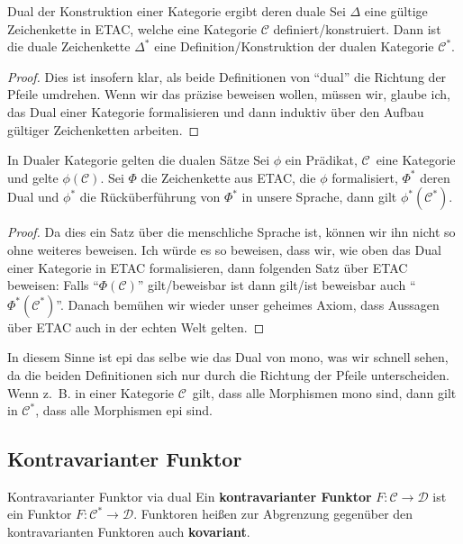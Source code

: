 \documentclass[a4paper]{amsart}
\theoremstyle{definition}
\newcommand{\CC}{\ensuremath{\mathcal{ C }}}
\newcommand{\DD}{\ensuremath{\mathcal{ D }}}
\newcommand{\zb}{z.~B. }
\begin{document}
\begin{Satz}{Dual der Konstruktion einer Kategorie ergibt deren duale}
   Sei $\Delta$ eine gültige Zeichenkette in ETAC, welche eine Kategorie $\CC$ definiert/konstruiert. Dann ist die duale Zeichenkette $\Delta^*$ eine Definition/Konstruktion der dualen Kategorie $\CC^*$.
\end{Satz}
\begin{proof}
   Dies ist insofern klar, als beide Definitionen von "`dual"' die Richtung der Pfeile umdrehen. Wenn wir das präzise beweisen wollen, müssen wir, glaube ich, das Dual einer Kategorie formalisieren und dann induktiv über den Aufbau gültiger Zeichenketten arbeiten.
\end{proof}

\begin{Satz}{In Dualer Kategorie gelten die dualen Sätze}
   Sei $\phi$ ein Prädikat, \CC\ eine Kategorie und gelte $\phi(\CC)$. Sei $\Phi$ die Zeichenkette aus ETAC, die $\phi$ formalisiert, $\Phi^*$ deren Dual und $\phi^*$ die Rücküberführung von $\Phi^*$ in unsere Sprache, dann gilt $\phi^*(\CC^*)$.
\end{Satz}
\begin{proof}
   Da dies ein Satz über die menschliche Sprache ist, können wir ihn nicht so ohne weiteres beweisen. Ich würde es so beweisen, dass wir, wie oben das  Dual einer Kategorie in ETAC formalisieren, dann folgenden Satz über ETAC beweisen: Falls "`$\Phi(\CC)$"' gilt/beweisbar ist dann gilt/ist beweisbar auch "`$\Phi^*(\CC^*)$"'. Danach bemühen wir wieder unser geheimes Axiom, dass Aussagen über ETAC auch in der echten Welt gelten.
\end{proof}

In diesem Sinne ist epi das selbe wie das Dual von mono, was wir schnell sehen, da die beiden Definitionen sich nur durch die Richtung der Pfeile unterscheiden. Wenn \zb in einer Kategorie \CC\ gilt, dass alle Morphismen mono sind, dann gilt in $\CC^*$, dass alle Morphismen epi sind.

\subsection{Kontravarianter Funktor}
\begin{Definition}{Kontravarianter Funktor via dual}
   Ein \textbf{kontravarianter Funktor} $F \colon \CC \to \DD$ ist ein Funktor $F \colon \CC^* \to \DD$. Funktoren heißen zur Abgrenzung gegenüber den kontravarianten Funktoren auch \textbf{kovariant}. 
\end{Definition}   
\end{document}
